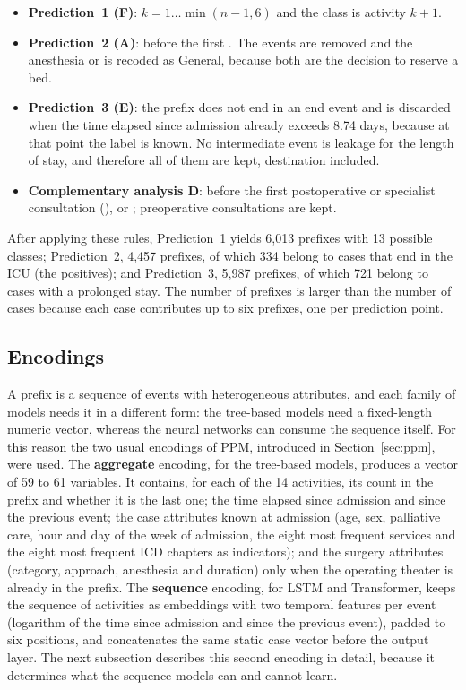 \begin{itemize}[leftmargin=*]
  \item \textbf{Prediction~1 (F)}: $k = 1 \ldots \min(n-1, 6)$ and the class is activity $k+1$.
  \item \textbf{Prediction~2 (A)}: before the first . The  events are removed and the anesthesia  or  is recoded as General, because both are the decision to reserve a bed.
  \item \textbf{Prediction~3 (E)}: the prefix does not end in an end event and is discarded when the time elapsed since admission already exceeds 8.74 days, because at that point the label is known. No intermediate event is leakage for the length of stay, and therefore all of them are kept, destination included.
  \item \textbf{Complementary analysis D}: before the first postoperative  or specialist consultation (),  or ; preoperative consultations are kept.
\end{itemize}

After applying these rules, Prediction~1 yields 6,013 prefixes with 13 possible classes; Prediction~2, 4,457 prefixes, of which 334 belong to cases that end in the ICU (the positives); and Prediction~3, 5,987 prefixes, of which 721 belong to cases with a prolonged stay. The number of prefixes is larger than the number of cases because each case contributes up to six prefixes, one per prediction point.

\subsection{Encodings}

A prefix is a sequence of events with heterogeneous attributes, and each family of models needs it in a different form: the tree-based models need a fixed-length numeric vector, whereas the neural networks can consume the sequence itself. For this reason the two usual encodings of PPM, introduced in Section~\ref{sec:ppm}, were used. The \textbf{aggregate} encoding, for the tree-based models, produces a vector of 59 to 61 variables. It contains, for each of the 14 activities, its count in the prefix and whether it is the last one; the time elapsed since admission and since the previous event; the case attributes known at admission (age, sex, palliative care, hour and day of the week of admission, the eight most frequent services and the eight most frequent ICD chapters as indicators); and the surgery attributes (category, approach, anesthesia and duration) only when the operating theater is already in the prefix. The \textbf{sequence} encoding, for LSTM and Transformer, keeps the sequence of activities as embeddings with two temporal features per event (logarithm of the time since admission and since the previous event), padded to six positions, and concatenates the same static case vector before the output layer. The next subsection describes this second encoding in detail, because it determines what the sequence models can and cannot learn.

